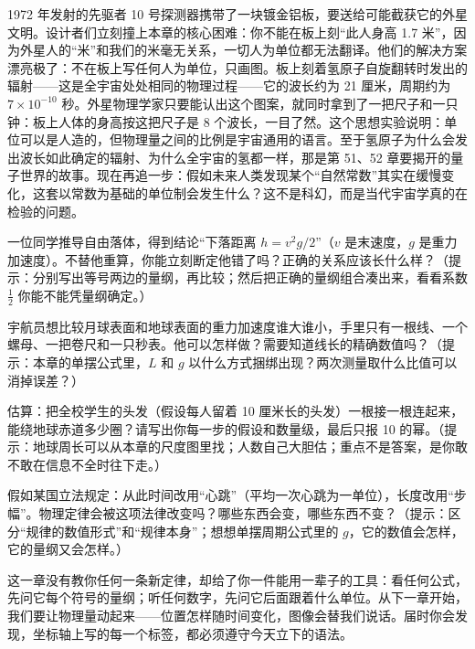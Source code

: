 \begin{thought}[怎么向外星人解释“一米”]
1972 年发射的先驱者 10 号探测器携带了一块镀金铝板，要送给可能截获它的外星文明。设计者们立刻撞上本章的核心困难：你不能在板上刻“此人身高 1.7 米”，因为外星人的“米”和我们的米毫无关系，一切人为单位都无法翻译。他们的解决方案漂亮极了：不在板上写任何人为单位，只画图。板上刻着氢原子自旋翻转时发出的辐射——这是全宇宙处处相同的物理过程——它的波长约为 21 厘米，周期约为 $7\times10^{-10}$ 秒。外星物理学家只要能认出这个图案，就同时拿到了一把尺子和一只钟：板上人体的身高按这把尺子是 8 个波长，一目了然。这个思想实验说明：单位可以是人造的，但物理量之间的比例是宇宙通用的语言。至于氢原子为什么会发出波长如此确定的辐射、为什么全宇宙的氢都一样，那是第 51、52 章要揭开的量子世界的故事。现在再追一步：假如未来人类发现某个“自然常数”其实在缓慢变化，这套以常数为基础的单位制会发生什么？这不是科幻，而是当代宇宙学真的在检验的问题。
\end{thought}

\begin{puzzles}
\item 一位同学推导自由落体，得到结论“下落距离 $h = v^2 g / 2$”（$v$ 是末速度，$g$ 是重力加速度）。不替他重算，你能立刻断定他错了吗？正确的关系应该长什么样？（提示：分别写出等号两边的量纲，再比较；然后把正确的量纲组合凑出来，看看系数 $\frac{1}{2}$ 你能不能凭量纲确定。）
\item 宇航员想比较月球表面和地球表面的重力加速度谁大谁小，手里只有一根线、一个螺母、一把卷尺和一只秒表。他可以怎样做？需要知道线长的精确数值吗？（提示：本章的单摆公式里，$L$ 和 $g$ 以什么方式捆绑出现？两次测量取什么比值可以消掉误差？）
\item 估算：把全校学生的头发（假设每人留着 10 厘米长的头发）一根接一根连起来，能绕地球赤道多少圈？请写出你每一步的假设和数量级，最后只报 10 的幂。（提示：地球周长可以从本章的尺度图里找；人数自己大胆估；重点不是答案，是你敢不敢在信息不全时往下走。）
\item 假如某国立法规定：从此时间改用“心跳”（平均一次心跳为一单位），长度改用“步幅”。物理定律会被这项法律改变吗？哪些东西会变，哪些东西不变？（提示：区分“规律的数值形式”和“规律本身”；想想单摆周期公式里的 $g$，它的数值会怎样，它的量纲又会怎样。）
\end{puzzles}

这一章没有教你任何一条新定律，却给了你一件能用一辈子的工具：看任何公式，先问它每个符号的量纲；听任何数字，先问它后面跟着什么单位。从下一章开始，我们要让物理量动起来——位置怎样随时间变化，图像会替我们说话。届时你会发现，坐标轴上写的每一个标签，都必须遵守今天立下的语法。
